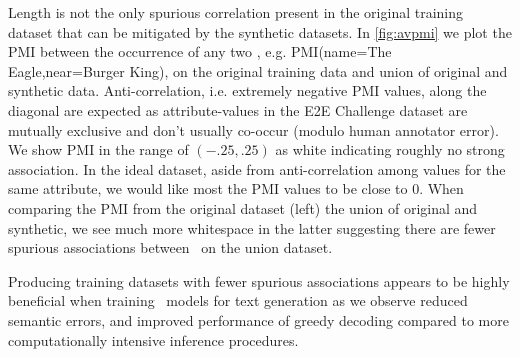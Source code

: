 

Length is not the only spurious correlation present in the original training
dataset that can be mitigated by the synthetic datasets. In \autoref{fig:avpmi}
we plot the PMI between the occurrence of any two \attributevalues, e.g.
PMI(name=The Eagle,near=Burger King), on the original training data and union
of original and synthetic data.  Anti-correlation, i.e. extremely negative PMI
values, along the diagonal are expected as attribute-values in the E2E
Challenge dataset are mutually exclusive and don't usually co-occur (modulo
human annotator error).  We show PMI in the range of $(-.25, .25)$ as white
indicating roughly no strong association. In the ideal dataset, aside from
anti-correlation among values for the same attribute, we would like most the
PMI values to be close to 0. When comparing the PMI from the original dataset
(left) the union of original and synthetic, we see much more whitespace in the
latter suggesting there are fewer spurious associations between
\attributevalues~on the union dataset.

Producing training datasets with fewer spurious associations appears to be
highly beneficial when training \sequencetosequence~models for text generation
as we observe reduced semantic errors, and improved performance of greedy
decoding compared to more computationally intensive inference procedures.
